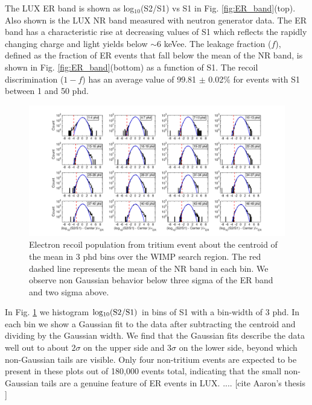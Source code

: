 The LUX ER band is shown as log$_{10}$(S2/S1) vs S1 in Fig. \ref{fig:ER_band}(top).  Also shown is the LUX NR band measured with neutron generator data\cite{DD-paper, lux-reanalysis}. The ER band has a characteristic rise at decreasing values of S1 which reflects the rapidly changing charge and light yields below $\sim$6 keVee. The leakage fraction ($f$), defined as the fraction of ER events that fall below the mean of the NR band, is shown in Fig. \ref{fig:ER_band}(bottom) as a function of S1. The recoil discrimination ($1-f$) has an average value of 99.81 $\pm$ 0.02\% for events with S1 between 1 and 50 phd.


\onecolumngrid
\break
\begin{figure}\centering
\includegraphics[width=220mm]{fig/Gaussianity/GaussER_all.png}
\caption{Electron recoil population from tritium event about the centroid of the mean in 3 phd bins over the WIMP search region. The red dashed line represents the mean of the NR band in each bin. We observe non Gaussian behavior below three sigma of the ER band and two sigma above.  }
\label{fig:ER-Gauss}
\end{figure}
\twocolumngrid

In Fig. \ref{fig:ER-Gauss} we histogram $\rm log_{10}(S2/S1)$ in bins of S1 with a bin-width of 3 phd. In each bin we show a Gaussian fit to the data after subtracting the centroid and dividing by the Gaussian width. We find that the Gaussian fits describe the data well out to about $2\sigma$ on the upper side and $3\sigma$ on the lower side, beyond which non-Gaussian tails are visible. Only four non-tritium events are expected to be present in these plots out of 180,000 events total, indicating that the small non-Gaussian tails are a genuine feature of ER events in LUX. .... [cite Aaron's thesis ]

